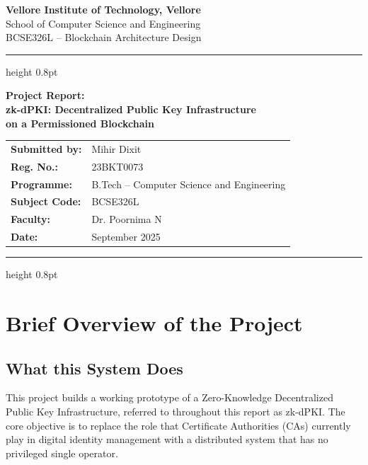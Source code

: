 \documentclass[12pt,a4paper]{article}
\begin{document}
\begin{titlepage}
\centering
\vspace*{1.8cm}
{\Large\bfseries Vellore Institute of Technology, Vellore}\\[0.4cm]
{\normalsize School of Computer Science and Engineering}\\[0.2cm]
{\normalsize BCSE326L -- Blockchain Architecture Design}\\[0.3cm]
\hrule height 0.8pt
\vspace{0.8cm}

{\LARGE\bfseries Project Report:\\[0.3cm]
zk-dPKI: Decentralized Public Key Infrastructure\\[0.2cm]
on a Permissioned Blockchain}

\vspace{1.4cm}
\begin{tabular}{ll}
\textbf{Submitted by:}  & Mihir Dixit \\
\textbf{Reg. No.:}      & 23BKT0073 \\
\textbf{Programme:}     & B.Tech -- Computer Science and Engineering \\
\textbf{Subject Code:}  & BCSE326L \\
\textbf{Faculty:}       & Dr. Poornima N \\
\textbf{Date:}          & September 2025 \\
\end{tabular}

\vspace*{\fill}
\hrule height 0.8pt
\end{titlepage}

\tableofcontents
\newpage

\section{Brief Overview of the Project}

\subsection{What this System Does}

This project builds a working prototype of a Zero-Knowledge Decentralized Public Key Infrastructure, referred to throughout this report as zk-dPKI. The core objective is to replace the role that Certificate Authorities (CAs) currently play in digital identity management with a distributed system that has no privileged single operator.
\end{document}
